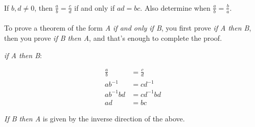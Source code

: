 \documentclass[12pt]{article}
\begin{document}
\subsubsection{}
If $b,d \neq 0$, then $\frac{a}{b} = \frac{c}{d}$ if and only if $ad=bc$. Also determine when $\frac{a}{b}=\frac{b}{a}$.\\\\
To prove a theorem of the form \emph{A if and only if B}, you first prove \emph{if A then B}, then you prove \emph{if B then A}, and that's enough to complete the proof.

\emph{if A then B}:

\begin{equation*}
\begin{split}
\frac{a}{b} &= \frac{c}{d}\\
ab^{-1} &= cd^{-1}\\
ab^{-1}bd &= cd^{-1}bd\\
ad &= bc
\end{split}
\end{equation*}

\emph{If B then A} is given by the inverse direction of the above.
\end{document}
